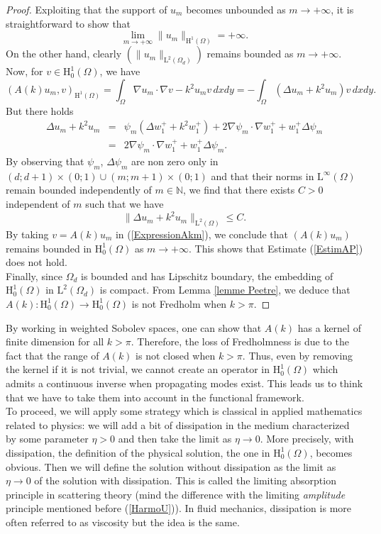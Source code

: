 \documentclass[11pt,a4paper]{report}
\newcommand{\Om}{\Omega}
\newcommand{\mrm}[1]{\mathrm{#1}}
\newcommand{\N}{\mathbb{N}}
\newcommand{\mL}{\mrm{L}}
\newcommand{\mH}{\mrm{H}}
\begin{document}
\begin{proof}
\noindent Exploiting that the support of $u_m$ becomes unbounded as $m\to+\infty$, it is straightforward to show that 
\[
\lim_{m\to+\infty}\|u_m\|_{\mH^1(\Om)}=+\infty.
\]
On the other hand, clearly  $(\|u_m\|_{\mL^2(\Om_d)})$ remains bounded as $m\to+\infty$. Now, for $v\in \mH^1_0(\Om)$, we have
\begin{equation}\label{ExpressionAkm}
(A(k)u_m,v)_{\mH^1(\Om)} = \int_{\Om}\nabla u_m\cdot\nabla v-k^2 u_mv\,dxdy=-\int_{\Om}(\Delta u_m +k^2 u_m)v\,dxdy.
\end{equation}
But there holds
\[
\begin{array}{rcl}
\Delta u_m +k^2 u_m&=&\psi_m(\Delta w_1^+ +k^2 w_1^+)+2\nabla \psi_m\cdot\nabla w_1^++w_1^+\Delta\psi_m \\[3pt]
&=&2\nabla \psi_m\cdot\nabla w_1^++w_1^+\Delta\psi_m.
\end{array}
\]
By observing that $\psi_m$, $\Delta\psi_m$ are non zero only in $(d;d+1)\times(0;1)\cup  (m;m+1)\times(0;1)$ and that their norms in $\mL^\infty(\Om)$ remain bounded independently of $m\in\N$, we find that there exists $C>0$ independent of $m$ such that we have
\[
\|\Delta u_m +k^2 u_m\|_{\mL^2(\Om)} \le C.
\]
By taking $v=A(k)u_m$ in (\ref{ExpressionAkm}), we conclude that $(A(k)u_m)$ remains bounded in  $\mH^1_0(\Om)$ as $m\to+\infty$. This shows that Estimate (\ref{EstimAP}) does not hold.\\
Finally, since $\Om_d$ is bounded and has Lipschitz boundary, the embedding of $\mH^1_0(\Om)$ in  $\mL^2(\Om_d)$ is compact. From Lemma \ref{lemme Peetre}, we deduce that $A(k):\mH^1_0(\Om)\to\mH^1_0(\Om)$ is not Fredholm when $k>\pi$.
\end{proof}
\noindent By working in weighted Sobolev spaces, one can show that $A(k)$ has a kernel of finite dimension for all $k>\pi$. Therefore, the loss of Fredholmness is due to the fact that the range of $A(k)$ is not closed when $k>\pi$. Thus, even by removing the kernel if it is not trivial, we cannot create an operator in $\mH^1_0(\Om)$ which admits a continuous inverse when propagating modes exist. This leads us to think that we have to take them into account in the functional framework.\\
\newline
To proceed, we will apply some strategy which is classical in applied mathematics related to physics: we will add a bit of dissipation in the medium characterized by some parameter $\eta>0$ and then take the limit as $\eta\to0$. More precisely, with dissipation, the definition of the physical solution, the one in $\mH^1_0(\Om)$, becomes obvious. Then we will define the solution without dissipation as the limit as $\eta\to0$ of the solution with dissipation. This is called the limiting absorption  principle in scattering theory (mind the difference with the limiting \textit{amplitude} principle mentioned before (\ref{HarmoU})). In fluid mechanics, dissipation is more often referred to as viscosity but the idea is the same. 
\end{document}
